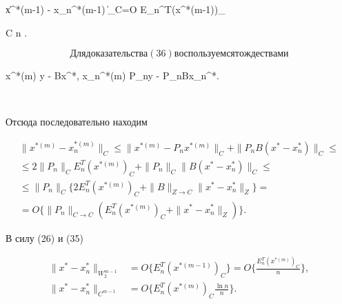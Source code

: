 \| x^{*(m-1)} - x_n^{*(m-1)} \|_{C}=O \lbrace E_n^T(x^{*(m-1)})_


{C} \ln n \rbrace.


$$





Для доказательства (36) воспользуемся тождествами


$$


x^{*(m)} \equiv y - Bx^*, \quad x_n^{*(m)} \equiv P_ny - P_nBx_n^*.


$$


Отсюда последовательно находим


\begin{multline}


\| x^{*(m)} - x_n^{*(m)} \|_{C} \leq \| x^{*(m)} - P_nx^{*(m)}


\|_{C} + \| P_nB(x^* - x_n^*) \|_{C} \leq \\


%


\leq 2 \| P_n \|_{C} E_n^T(x^{*(m)})_{C} + \| P_n \|_{C}


\| B(x^* - x_n^*) \|_{C} \leq \\


%


\leq \| P_n \|_{C} \lbrace 2E_n^T(x^{*(m)})_{C} + \| B \|_


{Z \to C} \| x^* - x_n^* \|_{Z} \rbrace=\\


%


=O \lbrace \| P_n \|_{C \to C} ( E_n^T(x^{*(m)})_{C} +


\| x^* - x_n^* \|_{Z} ) \rbrace.


\end{multline}





В силу (26) и (35)


\begin{align}


\| x^* - x_n^* \|_{W_2^{m-1}} &=O \lbrace E_n^T(x^{*(m-1)})_{C}


\rbrace=O \bigg\lbrace \frac{E_n^T(x^{*(m)})_{C}}{n} \bigg\rbrace, \\


%


\| x^* - x_n^* \|_{C^{m-1}} &=O \bigg\lbrace E_n^T(x^{*(m)})_{C}


\frac{\ln n}{n} \bigg\rbrace.


\end{align}


